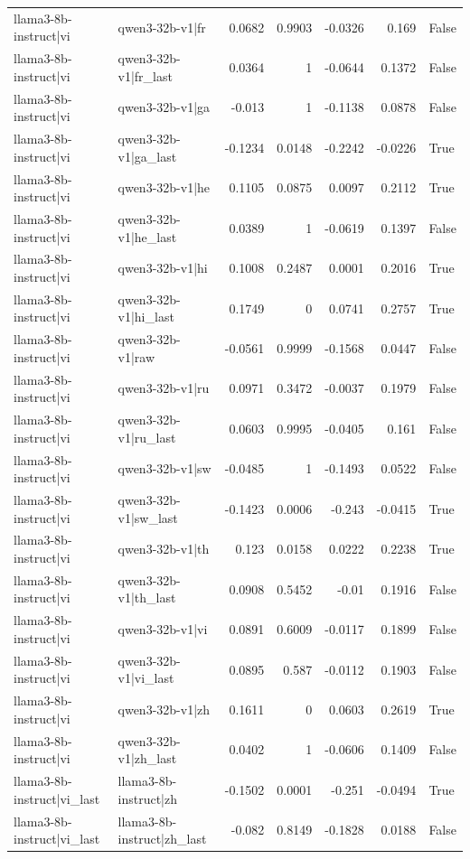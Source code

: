 \begin{table}
\begin{tabular}{l l r r r r l}
llama3-8b-instruct|vi & qwen3-32b-v1|fr & 0.0682 & 0.9903 & -0.0326 & 0.169 & False \\
llama3-8b-instruct|vi & qwen3-32b-v1|fr_last & 0.0364 & 1 & -0.0644 & 0.1372 & False \\
llama3-8b-instruct|vi & qwen3-32b-v1|ga & -0.013 & 1 & -0.1138 & 0.0878 & False \\
llama3-8b-instruct|vi & qwen3-32b-v1|ga_last & -0.1234 & 0.0148 & -0.2242 & -0.0226 & True \\
llama3-8b-instruct|vi & qwen3-32b-v1|he & 0.1105 & 0.0875 & 0.0097 & 0.2112 & True \\
llama3-8b-instruct|vi & qwen3-32b-v1|he_last & 0.0389 & 1 & -0.0619 & 0.1397 & False \\
llama3-8b-instruct|vi & qwen3-32b-v1|hi & 0.1008 & 0.2487 & 0.0001 & 0.2016 & True \\
llama3-8b-instruct|vi & qwen3-32b-v1|hi_last & 0.1749 & 0 & 0.0741 & 0.2757 & True \\
llama3-8b-instruct|vi & qwen3-32b-v1|raw & -0.0561 & 0.9999 & -0.1568 & 0.0447 & False \\
llama3-8b-instruct|vi & qwen3-32b-v1|ru & 0.0971 & 0.3472 & -0.0037 & 0.1979 & False \\
llama3-8b-instruct|vi & qwen3-32b-v1|ru_last & 0.0603 & 0.9995 & -0.0405 & 0.161 & False \\
llama3-8b-instruct|vi & qwen3-32b-v1|sw & -0.0485 & 1 & -0.1493 & 0.0522 & False \\
llama3-8b-instruct|vi & qwen3-32b-v1|sw_last & -0.1423 & 0.0006 & -0.243 & -0.0415 & True \\
llama3-8b-instruct|vi & qwen3-32b-v1|th & 0.123 & 0.0158 & 0.0222 & 0.2238 & True \\
llama3-8b-instruct|vi & qwen3-32b-v1|th_last & 0.0908 & 0.5452 & -0.01 & 0.1916 & False \\
llama3-8b-instruct|vi & qwen3-32b-v1|vi & 0.0891 & 0.6009 & -0.0117 & 0.1899 & False \\
llama3-8b-instruct|vi & qwen3-32b-v1|vi_last & 0.0895 & 0.587 & -0.0112 & 0.1903 & False \\
llama3-8b-instruct|vi & qwen3-32b-v1|zh & 0.1611 & 0 & 0.0603 & 0.2619 & True \\
llama3-8b-instruct|vi & qwen3-32b-v1|zh_last & 0.0402 & 1 & -0.0606 & 0.1409 & False \\
llama3-8b-instruct|vi_last & llama3-8b-instruct|zh & -0.1502 & 0.0001 & -0.251 & -0.0494 & True \\
llama3-8b-instruct|vi_last & llama3-8b-instruct|zh_last & -0.082 & 0.8149 & -0.1828 & 0.0188 & False \\

\end{tabular}
\end{table}
